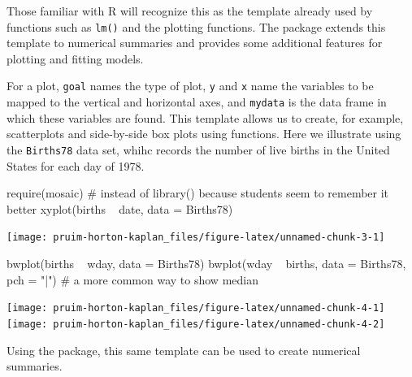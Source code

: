 \noindent
Those familiar with R will recognize this as the template already used
by functions such as \texttt{lm()} and the  plotting
functions. The  package extends this template to numerical
summaries and provides some additional features for plotting and fitting
models.

For a plot, \texttt{goal} names the type of plot, \texttt{y} and
\texttt{x} name the variables to be mapped to the vertical and
horizontal axes, and \texttt{mydata} is the data frame in which these
variables are found. This template allows us to create, for example,
scatterplots and side-by-side box plots using  functions.
Here we illustrate using the \texttt{Births78} data set, whihc records
the number of live births in the United States for each day of 1978.

\begin{Schunk}
\begin{Sinput}
require(mosaic)     # instead of library() because students seem to remember it better
xyplot(births ~ date, data = Births78)
\end{Sinput}


\begin{center}\texttt{[image: pruim-horton-kaplan\_files/figure-latex/unnamed-chunk-3-1]} \end{center}

\end{Schunk}\begin{Schunk}
\begin{Sinput}
bwplot(births ~ wday, data = Births78) 
bwplot(wday ~ births, data = Births78, pch = "|")  # a more common way to show median
\end{Sinput}


\begin{center}\texttt{[image: pruim-horton-kaplan\_files/figure-latex/unnamed-chunk-4-1]} \texttt{[image: pruim-horton-kaplan\_files/figure-latex/unnamed-chunk-4-2]} \end{center}

\end{Schunk}

\noindent
Using the  package, this same template can be used to create
numerical summaries.

